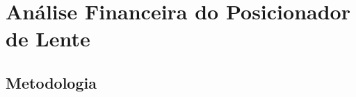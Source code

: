 \chapter[Análise Financeira do Posicionador de Lente]{Análise Financeira do Posicionador de Lente}

\section[Metodologia]{Metodologia}

